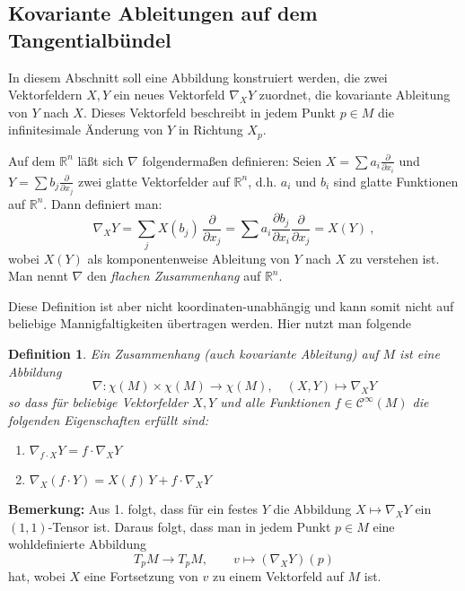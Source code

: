 \documentclass[12pt,a4paper]{article}
\def\R{\mathbb{R}}
\newtheorem{Definition}[Lemma]{Definition}
\begin{document}
\subsection{Kovariante Ableitungen auf dem Tangentialb\"undel}

\bigskip

In diesem Abschnitt soll eine Abbildung konstruiert werden, die zwei Vektorfeldern $X, Y$ ein neues Vektorfeld $\nabla_XY$ zuordnet,
die kovariante Ableitung von $Y$ nach $X$. Dieses Vektorfeld beschreibt in jedem Punkt $p \in M$ die infinitesimale \"Anderung von
$Y$ in Richtung $X_p$.

\bigskip

Auf dem $\R^n$ l\"a\ss t sich $\nabla$ folgenderma\ss en definieren: Seien $X = \sum a_i \frac{\partial}{\partial x_i}$
und $Y = \sum b_j \frac{\partial}{\partial x_j}$ zwei glatte Vektorfelder auf $\R^n$, d.h. $a_i$ und $b_i$ sind
glatte Funktionen auf $\R^n$. Dann definiert man:
$$
\nabla_XY = \sum_j X(b_j)\,\frac{\partial}{\partial x_j} = \sum a_i \frac{\partial b_j}{\partial x_i}
 \frac{\partial}{\partial x_j} = X(Y)\ ,
$$
wobei $X(Y)$ als komponentenweise Ableitung von $Y$ nach $X$ zu verstehen ist. Man nennt $\nabla$ den {\it flachen
Zusammenhang } auf $\R^n$.

\bigskip

Diese Definition ist aber  nicht koordinaten-unabh\"angig und kann somit nicht auf beliebige Mannigfaltigkeiten \"ubertragen
werden. Hier nutzt man folgende

\begin{Definition}
Ein {\em Zusammenhang} (auch {\em kovariante Ableitung}) auf $M$ ist eine Abbildung
$$
\nabla : \chi(M) \times \chi (M) \rightarrow \chi(M), \quad (X, Y) \mapsto \nabla_XY
$$
so dass f\"ur beliebige Vektorfelder $X, Y$ und alle Funktionen $f \in \mathcal C^\infty(M)$ die folgenden Eigenschaften erf\"ullt sind:
\begin{enumerate}
\item
\quad $\nabla_{f\cdot X}Y = f\cdot \nabla_XY$
\item
\quad $\nabla_X(f \cdot Y) = X(f)\,Y + f \cdot \nabla_XY$
\end{enumerate}
\end{Definition}


\bigskip

{\bf Bemerkung:}
Aus 1. folgt, dass f\"ur ein festes $Y$ die Abbildung $X \mapsto \nabla_XY$ ein $(1,1)$-Tensor ist.
Daraus folgt, dass man in jedem Punkt $p\in M$ eine wohldefinierte Abbildung
$$
T_pM \rightarrow T_pM, \qquad v \mapsto (\nabla_XY)(p)
$$
hat, wobei $X$ eine Fortsetzung von $v$ zu einem Vektorfeld auf $M$ ist.
\end{document}
